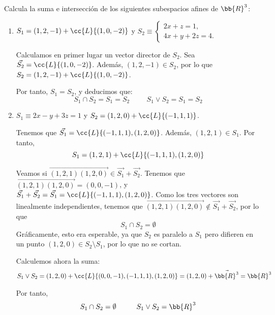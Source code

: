 \begin{ejercicio}
    Calcula la suma e intersección de los siguientes subespacios afines de $\bb{R}^3$:
    \begin{enumerate}
        \item $S_1=(1,2,-1)+\cc{L}\{(1,0,-2)\}$ y $S_2\equiv \left\{\begin{array}{l}
            2x+z=1, \\
            4x+y+2z=4.
        \end{array}\right.$

        Calculamos en primer lugar un vector director de $S_2$. Sea $\vec{S_2}=\cc{L}\{(1,0,-2)\}$. Además, $(1,2,-1)\in S_2$, por lo que $S_2=(1,2,-1)+\cc{L}\{(1,0,-2)\}$.

        Por tanto, $S_1=S_2$, y deducimos que:
        \begin{equation*}
            S_1\cap S_2 = S_1=S_2 \hspace{1cm} S_1\vee S_2 = S_1=S_2
        \end{equation*}
        
        \item $S_1\equiv 2x-y+3z=1$ y $S_2=(1,2,0)+\cc{L}\{(-1,1,1)\}$.
        
        Tenemos que $\vec{S_1}=\cc{L}\{(-1, 1, 1), (1, 2, 0)\}$. Además, $(1,2,1)\in S_1$. Por tanto, $$S_1=(1,2,1)+\cc{L}\{(-1,1,1), (1,2,0)\}$$

        Veamos si $\vec{(1,2,1)(1,2,0)}\in \vec{S_1}+\vec{S_2}$. Tenemos que $\vec{(1,2,1)(1,2,0)}=(0,0,-1)$, y $\vec{S_1}+\vec{S_2}=\vec{S_1}=\cc{L}\{(-1,1,1), (1,2,0)\}$. Como los tres vectores son linealmente independientes, tenemos que $\vec{(1,2,1)(1,2,0)}\notin \vec{S_1}+\vec{S_2}$, por lo que $$S_1\cap S_2=\emptyset$$
        Gráficamente, esto era esperable, ya que $S_2$ es paralelo a $S_1$ pero difieren en un punto $(1,2,0)\in S_2\setminus S_1$, por lo que no se cortan.
        
        Calculemos ahora la suma:
        \begin{multline*}
            S_1\vee S_2 = (1,2,0) + \cc{L}\{(0,0,-1), (-1,1,1), (1,2,0)\} = (1,2,0) + \vec{\bb{R}^3} = \bb{R}^3
        \end{multline*}

        Por tanto,
        \begin{equation*}
            S_1\cap S_2 = \emptyset \hspace{1cm} S_1\vee S_2 = \bb{R}^3
        \end{equation*}
        

\end{enumerate}
\end{ejercicio}

